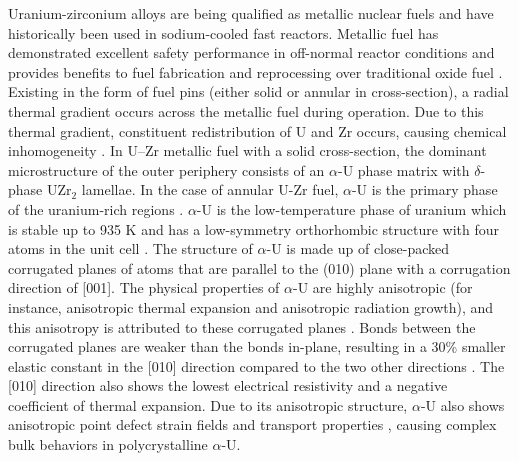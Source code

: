 \documentclass[review]{elsarticle}
\begin{document}
\par Uranium-zirconium alloys are being qualified as metallic nuclear fuels and have historically been used in sodium-cooled fast reactors. Metallic fuel has demonstrated excellent safety performance in off-normal reactor conditions and provides benefits to fuel fabrication and reprocessing over traditional oxide fuel \cite{hofman1997}. Existing in the form of fuel pins (either solid or annular in cross-section), a radial thermal gradient occurs across the metallic fuel during operation. Due to this thermal gradient, constituent redistribution of U and Zr occurs, causing chemical inhomogeneity \cite{WILLIAMS2020107016}. In U–Zr metallic fuel with a solid cross-section, the dominant microstructure of the outer periphery consists of an $\alpha$-U phase matrix \cite{1993_Rest} with $\delta$-phase UZr$_2$ lamellae. In the case of annular U-Zr fuel, $\alpha$-U is the primary phase of the uranium-rich regions \cite{YAO2020152536, THOMAS2023154443}. $\alpha$-U is the low-temperature phase of uranium which is stable up to 935 K \cite{hofman1996} and has a low-symmetry orthorhombic structure with four atoms in the unit cell \cite{beeler2013}. The structure of $\alpha$-U is made up of close-packed corrugated planes of atoms that are parallel to the (010) plane with a corrugation direction of [001]. The physical properties of $\alpha$-U are highly anisotropic (for instance, anisotropic thermal expansion and anisotropic radiation growth), and this anisotropy is attributed to these corrugated planes \cite{ma15124106}. Bonds between the corrugated planes are weaker than the bonds in-plane, resulting in a 30\% smaller elastic constant in the [010] direction compared to the two other directions \cite{ma15124106}. The [010] direction also shows the lowest electrical resistivity and a negative coefficient of thermal expansion. Due to its anisotropic structure, $\alpha$-U also shows anisotropic point defect strain fields and transport properties \cite{MAHBUBA2021153072,Huang_2011,beeler2010,henley2014advances,beeler_mahbuba_wang_jokisaari_2021}, causing complex bulk behaviors in polycrystalline $\alpha$-U. 



\end{document}
